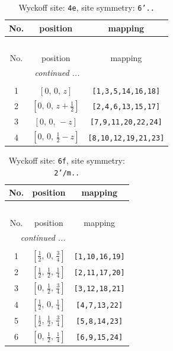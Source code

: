 \documentclass[fleqn,8pt]{jsarticle}
\begin{document}
\renewcommand{\arraystretch}{1.2}
\begin{longtable}{ccc}
\caption{Wyckoff site: {\tt 4e}, site symmetry: {\tt 6'..}}
 \\
 \hline \hline
No. & position & mapping \\ \hline \endfirsthead

\multicolumn{2}{l}{\tablename\ \thetable{}} \\
 \hline \hline
No. & position & mapping \\ \hline \endhead

 \hline \hline
\multicolumn{2}{r}{\footnotesize\it continued ...} \\ \endfoot

 \hline \hline
\multicolumn{2}{r}{} \\ \endlastfoot

1 & $\left[ 0,\, 0,\, z \right]$ & {\tt [1,3,5,14,16,18]} \\ \hline
2 & $\left[ 0,\, 0,\, z + \frac{1}{2} \right]$ & {\tt [2,4,6,13,15,17]} \\ \hline
3 & $\left[ 0,\, 0,\, - z \right]$ & {\tt [7,9,11,20,22,24]} \\ \hline
4 & $\left[ 0,\, 0,\, \frac{1}{2} - z \right]$ & {\tt [8,10,12,19,21,23]} \\
\end{longtable}
\renewcommand{\arraystretch}{1.2}
\begin{longtable}{ccc}
\caption{Wyckoff site: {\tt 6f}, site symmetry: {\tt 2'/m..}}
 \\
 \hline \hline
No. & position & mapping \\ \hline \endfirsthead

\multicolumn{2}{l}{\tablename\ \thetable{}} \\
 \hline \hline
No. & position & mapping \\ \hline \endhead

 \hline \hline
\multicolumn{2}{r}{\footnotesize\it continued ...} \\ \endfoot

 \hline \hline
\multicolumn{2}{r}{} \\ \endlastfoot

1 & $\left[ \frac{1}{2},\, 0,\, \frac{3}{4} \right]$ & {\tt [1,10,16,19]} \\ \hline
2 & $\left[ \frac{1}{2},\, \frac{1}{2},\, \frac{1}{4} \right]$ & {\tt [2,11,17,20]} \\ \hline
3 & $\left[ 0,\, \frac{1}{2},\, \frac{3}{4} \right]$ & {\tt [3,12,18,21]} \\ \hline
4 & $\left[ \frac{1}{2},\, 0,\, \frac{1}{4} \right]$ & {\tt [4,7,13,22]} \\ \hline
5 & $\left[ \frac{1}{2},\, \frac{1}{2},\, \frac{3}{4} \right]$ & {\tt [5,8,14,23]} \\ \hline
6 & $\left[ 0,\, \frac{1}{2},\, \frac{1}{4} \right]$ & {\tt [6,9,15,24]} \\
\end{longtable}
\end{document}
